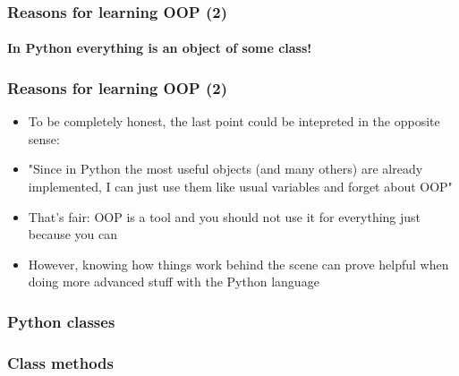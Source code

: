 \documentclass[9pt]{beamer}
\begin{document}
\begin{frame}
  \frametitle{Reasons for learning OOP (2)}
  \framesubtitle{In Python everything is an object of some class!}

  
\end{frame}


\begin{frame}
  \frametitle{Reasons for learning OOP (2)}
  
  \begin{itemize}
    \item To be completely honest, the last point could be intepreted in the
          opposite sense:
    \medskip
    \item "Since in Python the most useful objects (and many others) are already
           implemented, I can just use them like usual variables and forget
           about OOP"
    \medskip
    \item That's fair: OOP is a tool and you should not use it for everything
          just because you can
    \medskip
    \item However, knowing how things work behind the scene can 
          prove helpful when doing more advanced stuff with the Python 
          language
  \end{itemize}
  
\end{frame}


\begin{frame}
  \frametitle{Python classes}
  
\end{frame}


\begin{frame}
  \frametitle{Class methods}
  
\end{frame}
\end{document}
